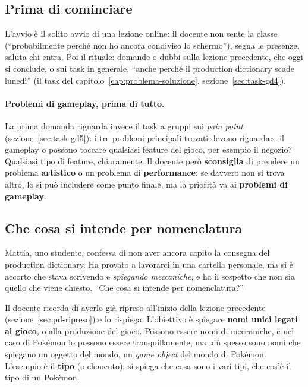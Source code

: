 \subsection{Prima di cominciare}

L'avvio è il solito avvio di una lezione online: il docente non sente la
classe (``probabilmente perché non ho ancora condiviso lo schermo''), segna le
presenze, saluta chi entra. Poi il rituale: domande o dubbi sulla lezione
precedente, che oggi si conclude, o sui task in generale, ``anche perché il
production dictionary scade lunedì'' (il task del
capitolo~\ref{cap:problema-soluzione}, sezione~\ref{sec:task-gd4}).

\paragraph{Problemi di gameplay, prima di tutto.} La prima domanda riguarda
invece il task a gruppi sui \emph{pain point}
(sezione~\ref{sec:task-gd5}): i tre problemi principali trovati devono
riguardare il gameplay o possono toccare qualsiasi feature del gioco, per
esempio il negozio? Qualsiasi tipo di feature, chiaramente. Il docente però
\textbf{sconsiglia} di prendere un problema \textbf{artistico} o un problema
di \textbf{performance}: se davvero non si trova altro, lo si può includere
come punto finale, ma la priorità va ai \textbf{problemi di gameplay}.

\subsection{Che cosa si intende per nomenclatura}

Mattia, uno studente, confessa di non aver ancora capito la consegna del
production dictionary. Ha provato a lavorarci in una cartella personale, ma
si è accorto che stava scrivendo e \emph{spiegando meccaniche}, e ha il
sospetto che non sia quello che viene chiesto. ``Che cosa si intende per
nomenclatura?''

Il docente ricorda di averlo già ripreso all'inizio della lezione precedente
(sezione~\ref{sec:pd-ripreso}) e lo rispiega. L'obiettivo è spiegare
\textbf{nomi unici legati al gioco}, o alla produzione del gioco. Possono
essere nomi di meccaniche, e nel caso di Pokémon lo possono essere
tranquillamente; ma più spesso sono nomi che spiegano un oggetto del mondo,
un \emph{game object} del mondo di Pokémon. L'esempio è il \textbf{tipo} (o
elemento): si spiega che cosa sono i vari tipi, che cos'è il tipo di un
Pokémon.

